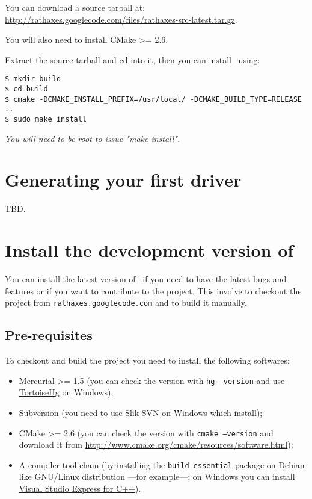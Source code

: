 \documentclass[american]{rtxarticle}
\begin{document}
You can download a source tarball at: \url{http://rathaxes.googlecode.com/files/rathaxes-src-latest.tar.gz}.

You will also need to install CMake >= 2.6.

Extract the source tarball and cd into it, then you can install \rtx\ using:

\begin{verbatim}
$ mkdir build
$ cd build
$ cmake -DCMAKE_INSTALL_PREFIX=/usr/local/ -DCMAKE_BUILD_TYPE=RELEASE ..
$ sudo make install
\end{verbatim}

\emph{You will need to be root to issue "make install".}

\section{Generating your first driver}

TBD.

\section{Install the development version of \rtx}

You can install the latest version of \rtx\ if you need to have the latest bugs
and features or if you want to contribute to the project. This involve to
checkout the project from \texttt{rathaxes.googlecode.com} and to build it
manually.

\subsection{Pre-requisites}

To checkout and build the project you need to install the following softwares:
\begin{itemize}
\item Mercurial >= 1.5 (you can check the version with \texttt{hg --version}
      and use \href{http://tortoisehg.bitbucket.org/download/index.html}{TortoiseHg}
      on Windows);
\item Subversion (you need to use \href{http://www.sliksvn.com/en/download}{Slik
      SVN} on Windows which install);
\item CMake >= 2.6 (you can check the version with \texttt{cmake --version} and
      download it from \url{http://www.cmake.org/cmake/resources/software.html});
\item A compiler tool-chain (by installing the \texttt{build-essential} package on
      Debian-like GNU/Linux distribution ---for example---; on Windows you can
      install \href{http://www.microsoft.com/express/Downloads/#2010-Visual-CPP}{Visual Studio Express for C++}).
\end{itemize}
\end{document}
